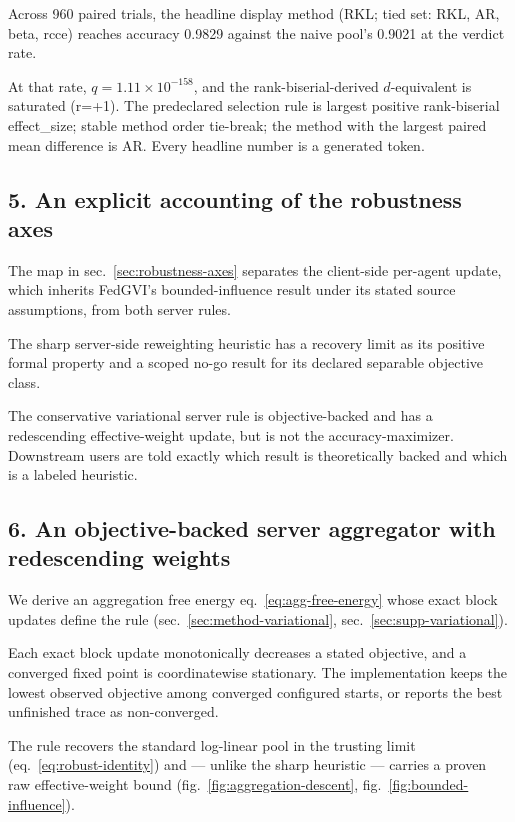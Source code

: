 \documentclass[
  english,
]{article}
\theoremstyle{plain}
\theoremstyle{definition}
\theoremstyle{remark}
\theoremstyle{definition}
\begin{document}
Across 960 paired trials, the headline display method (RKL; tied set:
RKL, AR, beta, rcce) reaches accuracy 0.9829 against the naive pool's
0.9021 at the verdict rate.

At that rate, \(q = 1.11 \times 10^{-158}\), and the
rank-biserial-derived \(d\)-equivalent is saturated (r=+1). The
predeclared selection rule is largest positive rank-biserial
effect\_size; stable method order tie-break; the method with the largest
paired mean difference is AR. Every headline number is a generated
token.

\subsection{5. An explicit accounting of the robustness
axes}\label{an-explicit-accounting-of-the-robustness-axes}

The map in sec.~\ref{sec:robustness-axes} separates the client-side
per-agent update, which inherits FedGVI's bounded-influence result under
its stated source assumptions, from both server rules.

The sharp server-side reweighting heuristic has a recovery limit as its
positive formal property and a scoped no-go result for its declared
separable objective class.

The conservative variational server rule is objective-backed and has a
redescending effective-weight update, but is not the accuracy-maximizer.
Downstream users are told exactly which result is theoretically backed
and which is a labeled heuristic.

\subsection{6. An objective-backed server aggregator with redescending
weights}\label{an-objective-backed-server-aggregator-with-redescending-weights}

We derive an aggregation free energy eq.~\ref{eq:agg-free-energy} whose
exact block updates define the  rule
(sec.~\ref{sec:method-variational}, sec.~\ref{sec:supp-variational}).

Each exact block update monotonically decreases a stated objective, and
a converged fixed point is coordinatewise stationary. The implementation
keeps the lowest observed objective among converged configured starts,
or reports the best unfinished trace as non-converged.

The rule recovers the standard log-linear pool in the trusting limit
(eq.~\ref{eq:robust-identity}) and --- unlike the sharp heuristic ---
carries a proven raw effective-weight bound
(fig.~\ref{fig:aggregation-descent}, fig.~\ref{fig:bounded-influence}).
\end{document}
